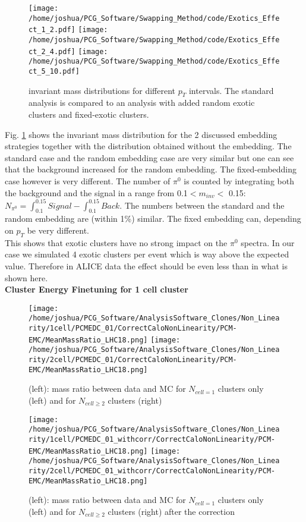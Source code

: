 \documentclass[ALICE]{ALICE_analysis_notes}
\begin{document}
\begin{figure}[h!]
	\centering
	\texttt{[image: /home/joshua/PCG\_Software/Swapping\_Method/code/Exotics\_Effect\_1\_2.pdf]}
	\texttt{[image: /home/joshua/PCG\_Software/Swapping\_Method/code/Exotics\_Effect\_2\_4.pdf]}
	\texttt{[image: /home/joshua/PCG\_Software/Swapping\_Method/code/Exotics\_Effect\_5\_10.pdf]}
	\caption{invariant mass distributions for different $p_{T}$ intervals. The standard analysis is compared to an analysis with added random exotic clusters and fixed-exotic clusters. }
	\label{fig:NCells_Exotics}
\end{figure}

Fig. \ref{fig:NCells_Exotics} shows the invariant mass distribution for the 2 discussed embedding strategies together with the distribution obtained without the embedding. The standard case and the random embedding case are very similar but one can see that the background increased for the random embedding. The fixed-embedding case however is very different. The number of $\pi^{0}$ is counted by integrating both the background and the signal in a range from 0.1$< m_{inv} <$ 0.15: $N_{\pi^{0}} = \int_{0.1}^{0.15} Signal -\int_{0.1}^{0.15} Back$. The numbers between the standard and the random embedding are (within 1\%) similar. The fixed embedding can, depending on $p_{T}$ be very different.\\
This shows that exotic clusters have no strong impact on the $\pi^{0}$ spectra. In our case we simulated 4 exotic clusters per event which is way above the expected value. Therefore in ALICE data the effect should be even less than in what is shown here.\\


\textbf{Cluster Energy Finetuning for 1 cell cluster}\\
\begin{figure}[h!]
	\centering
	\texttt{[image: /home/joshua/PCG\_Software/AnalysisSoftware\_Clones/Non\_Linearity/1cell/PCMEDC\_01/CorrectCaloNonLinearity/PCM-EMC/MeanMassRatio\_LHC18.png]}
	\texttt{[image: /home/joshua/PCG\_Software/AnalysisSoftware\_Clones/Non\_Linearity/2cell/PCMEDC\_01/CorrectCaloNonLinearity/PCM-EMC/MeanMassRatio\_LHC18.png]}
	\caption{ (left): mass ratio between data and MC for $N_{cell = 1}$ clusters only (left) and for $N_{cell \geq 2}$ clusters (right) }
	\label{fig:NonLin}
\end{figure}


\begin{figure}[h!]
	\centering
	\texttt{[image: /home/joshua/PCG\_Software/AnalysisSoftware\_Clones/Non\_Linearity/1cell/PCMEDC\_01\_withcorr/CorrectCaloNonLinearity/PCM-EMC/MeanMassRatio\_LHC18.png]}
	\texttt{[image: /home/joshua/PCG\_Software/AnalysisSoftware\_Clones/Non\_Linearity/2cell/PCMEDC\_01\_withcorr/CorrectCaloNonLinearity/PCM-EMC/MeanMassRatio\_LHC18.png]}
	\caption{ (left): mass ratio between data and MC for $N_{cell = 1}$ clusters only (left) and for $N_{cell \geq 2}$ clusters (right) after the correction }
	\label{fig:NonLin2}
\end{figure}
\end{document}
